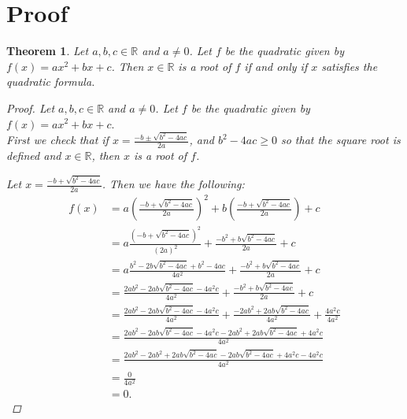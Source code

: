 \documentclass[12pt, letterpaper]{article}
\newtheorem{thm}{Theorem}[section]
\theoremstyle{definition}
\begin{document}
\section{Proof} \label{sec3}
\begin{thm}
    Let \(a, b, c \in \mathbb{R}\) and \(a \ne 0\).
    Let \(f\) be the quadratic given by \(f(x) = a x^2 + bx + c\).
    Then \(x \in \mathbb{R}\) is a root of \(f\) if and only if \(x\) satisfies the
    quadratic formula.

    \begin{proof}
        Let \(a, b, c \in \mathbb{R}\) and \(a \ne 0\).
        Let \(f\) be the quadratic given by \(f(x) = a x^2 + bx + c.\) \\

        First we check that if \(x=\frac{-b \pm \sqrt{b^2 - 4 a c}}{2a}\), and \(b^2 - 4ac \ge 0\)
        so that the square root is defined and \(x \in \mathbb{R}\),
        then \(x\) is a root of \(f\).

        Let \(x = \frac{-b + \sqrt{b^2 - 4 a c}}{2a}\).
        Then we have the following:
        \begin{align*}
        f(x) &= a \left(\frac{-b + \sqrt{b^2 - 4 a c}}{2a}\right)^2
                + b \left(\frac{-b + \sqrt{b^2 - 4 a c}}{2a}\right) + c \\
             &= a \frac{\left(-b + \sqrt{b^2 - 4 a c}\right)^2}{\left(2a\right)^2}
                + \frac{-b^2 + b\sqrt{b^2 - 4 a c}}{2a} + c \\
             &= a \frac{b^2 - 2b \sqrt{b^2 - 4 a c} + b^2 - 4 a c}{4a^2}
                + \frac{-b^2 + b\sqrt{b^2 - 4 a c}}{2a} + c \\
             &= \frac{2 a b^2 - 2ab \sqrt{b^2 - 4 a c} - 4 a^2 c}{4a^2}
                + \frac{-b^2 + b\sqrt{b^2 - 4 a c}}{2a} + c \\
             &= \frac{2 a b^2 - 2ab \sqrt{b^2 - 4 a c} - 4 a^2 c}{4a^2}
             + \frac{-2ab^2 + 2ab\sqrt{b^2 - 4 a c}}{4a^2} + \frac{4a^2c}{4a^2} \\
             &= \frac{2 a b^2 - 2ab \sqrt{b^2 - 4 a c} - 4 a^2 c
                -2ab^2 + 2ab\sqrt{b^2 - 4 a c} + 4a^2c}{4a^2} \\
             &= \frac{2 a b^2 -2ab^2 + 2ab\sqrt{b^2 - 4 a c} - 2ab \sqrt{b^2 - 4 a c}
                + 4a^2c  - 4 a^2 c}{4a^2} \\
             &= \frac{0}{4a^2} \\
             &= 0.
        \end{align*}


\end{proof}
\end{thm}
\end{document}
